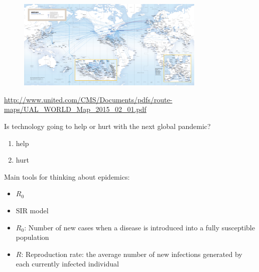 \documentclass[aspectratio=169]{beamer}
\begin{document}
\begin{frame}

\begin{figure}
\includegraphics[width=0.8\textwidth]{figures/UAL_WORLD_Map_2015_02_01}
\end{figure}

\tiny{\url{http://www.united.com/CMS/Documents/pdfs/route-maps/UAL_WORLD_Map_2015_02_01.pdf}}


\end{frame}
\begin{frame}

Is technology going to help or hurt with the next global pandemic?
\begin{enumerate}
\item help
\item hurt
\end{enumerate}


\end{frame}
\begin{frame}

Main tools for thinking about epidemics:
\begin{itemize}
\item $R_0$
\item SIR model
\end{itemize}

\note{
}

\end{frame}
\begin{frame}

\begin{itemize}
\item $R_0$: Number of new cases when a disease is introduced into a fully susceptible population
\pause
\item $R$: Reproduction rate: the average number of new infections generated by each currently infected individual 
\end{itemize}

\note{
}

\end{frame}
\end{document}
